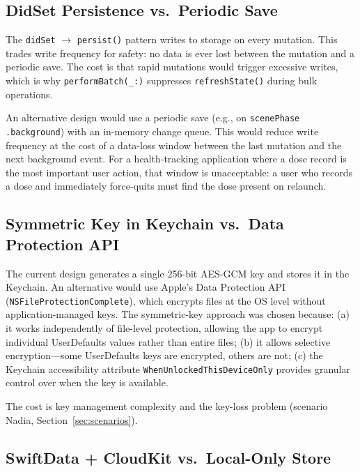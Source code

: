 \documentclass[11pt,a4paper]{article}
\newcommand{\code}[1]{\texttt{\small #1}}
\begin{document}
\subsection{DidSet Persistence vs.\ Periodic Save}
\label{sec:didSet_tradeoff}

The \code{didSet} $\to$ \code{persist()} pattern writes to storage on every
mutation. This trades write frequency for safety: no data is ever lost
between the mutation and a periodic save. The cost is that rapid mutations
would trigger excessive writes, which is why \code{performBatch(\_:)}
suppresses \code{refreshState()} during bulk operations.

An alternative design would use a periodic save (e.g., on
\code{scenePhase} \code{.background}) with an in-memory change queue. This
would reduce write frequency at the cost of a data-loss window between the
last mutation and the next background event. For a health-tracking
application where a dose record is the most important user action, that
window is unacceptable: a user who records a dose and immediately
force-quits must find the dose present on relaunch.

\subsection{Symmetric Key in Keychain vs.\ Data Protection API}
\label{sec:symmetric_vs_dp}

The current design generates a single 256-bit AES-GCM key and stores it in
the Keychain. An alternative would use Apple's Data Protection API
(\code{NSFileProtectionComplete}), which encrypts files at the OS level
without application-managed keys. The symmetric-key approach was chosen
because: (a) it works independently of file-level protection, allowing the
app to encrypt individual UserDefaults values rather than entire files;
(b) it allows selective encryption---some UserDefaults keys are encrypted,
others are not; (c) the Keychain accessibility attribute
\code{WhenUnlockedThisDeviceOnly} provides granular control over when the
key is available.

The cost is key management complexity and the key-loss problem (scenario
Nadia, Section~\ref{sec:scenarios}).

\subsection{SwiftData + CloudKit vs.\ Local-Only Store}
\label{sec:swiftdata_vs_local}
\end{document}
